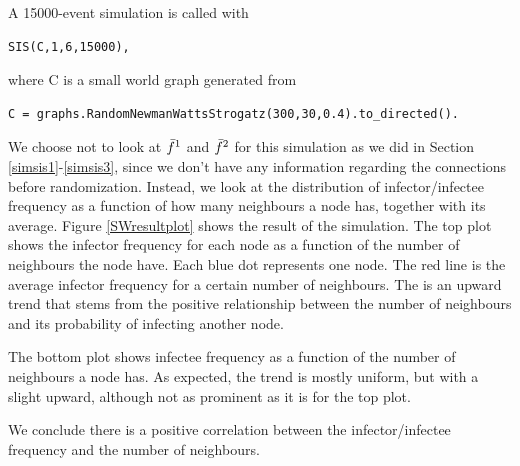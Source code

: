 \documentclass[12pt]{article} %
\numberwithin{equation}{section}
\begin{document}
A 15000-event simulation is called with 
\begin{verbatim}
SIS(C,1,6,15000),
\end{verbatim} 
where C is a small world graph generated from 
\begin{verbatim}
C = graphs.RandomNewmanWattsStrogatz(300,30,0.4).to_directed().
\end{verbatim}
We choose not to look at $\Bar{f}^1$ and $\Bar{f}^2$ for this simulation as we did in Section \ref{simsis1}-\ref{simsis3}, since we don't have any information regarding the connections before randomization. Instead, we look at the distribution of infector/infectee frequency as a function of how many neighbours a node has, together with its average.
Figure \ref{SWresultplot} shows the result of the simulation. The top plot shows the infector frequency for each node as a function of the number of neighbours the node have. Each blue dot represents one node. The red line is the average infector frequency for a certain number of neighbours. The is an upward trend that stems from the positive relationship between the number of neighbours and its probability of infecting another node.

The bottom plot shows infectee frequency as a function of the number of neighbours a node has. As expected, the trend is mostly uniform, but with a slight upward, although not as prominent as it is for the top plot. 

We conclude there is a positive correlation between the infector/infectee frequency and the number of neighbours.
\end{document}
